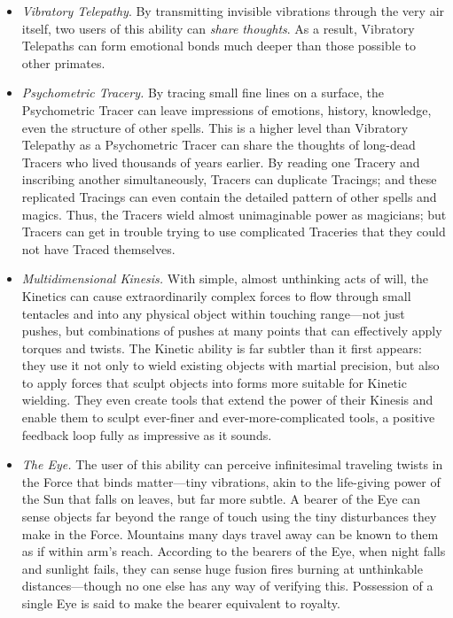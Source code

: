 \begin{itemize}
\item {
 \textit{Vibratory Telepathy}. By transmitting invisible vibrations
through the very air itself, two users of this ability can
\textit{share thoughts}. As a result, Vibratory Telepaths can form
emotional bonds much deeper than those possible to other primates.}

\item {
 \textit{Psychometric Tracery.} By tracing small fine lines on a
surface, the Psychometric Tracer can leave impressions of emotions,
history, knowledge, even the structure of other spells. This is a
higher level than Vibratory Telepathy as a Psychometric Tracer can
share the thoughts of long-dead Tracers who lived thousands of years
earlier. By reading one Tracery and inscribing another simultaneously,
Tracers can duplicate Tracings; and these replicated Tracings can even
contain the detailed pattern of other spells and magics. Thus, the
Tracers wield almost unimaginable power as magicians; but Tracers can
get in trouble trying to use complicated Traceries that they could not
have Traced themselves.}

\item {
 \textit{Multidimensional Kinesis.} With simple, almost unthinking
acts of will, the Kinetics can cause extraordinarily complex forces to
flow through small tentacles and into any physical object within
touching range---not just pushes, but combinations of pushes at many
points that can effectively apply torques and twists. The Kinetic
ability is far subtler than it first appears: they use it not only to
wield existing objects with martial precision, but also to apply forces
that sculpt objects into forms more suitable for Kinetic wielding. They
even create tools that extend the power of their Kinesis and enable
them to sculpt ever-finer and ever-more-complicated tools, a positive
feedback loop fully as impressive as it sounds.}

\item {
 \textit{The Eye.} The user of this ability can perceive
infinitesimal traveling twists in the Force that binds matter---tiny
vibrations, akin to the life-giving power of the Sun that falls on
leaves, but far more subtle. A bearer of the Eye can sense objects far
beyond the range of touch using the tiny disturbances they make in the
Force. Mountains many days travel away can be known to them as if
within arm's reach. According to the bearers of the
Eye, when night falls and sunlight fails, they can sense huge fusion
fires burning at unthinkable distances---though no one else has any way
of verifying this. Possession of a single Eye is said to make the
bearer equivalent to royalty.}
\end{itemize}

